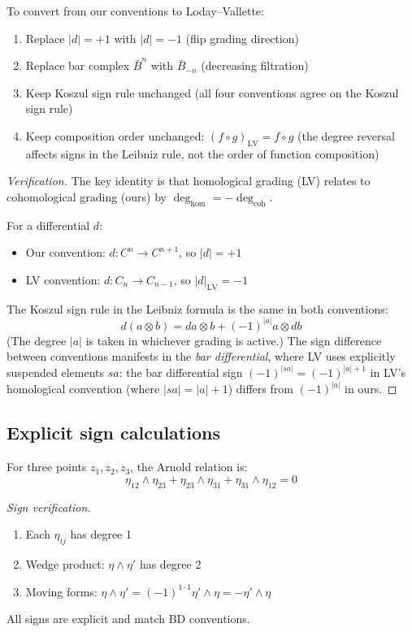 \begin{proposition}\label{prop:LV-conversion-complete}
To convert from our conventions to Loday--Vallette:
\begin{enumerate}
\item Replace $|d| = +1$ with $|d| = -1$ (flip grading direction)
\item Replace bar complex $\bar{B}^n$ with $\bar{B}_{-n}$ (decreasing filtration)
\item Keep Koszul sign rule unchanged (all four conventions agree on the Koszul sign rule)
\item Keep composition order unchanged: $(f \circ g)_{\text{LV}} = f \circ g$ (the degree reversal affects signs in the Leibniz rule, not the order of function composition)
\end{enumerate}
\end{proposition}

\begin{proof}[Verification]
The key identity is that homological grading (LV) relates to cohomological grading 
(ours) by $\deg_{\text{hom}} = -\deg_{\text{coh}}$.

For a differential $d$:
\begin{itemize}
\item Our convention: $d: C^n \to C^{n+1}$, so $|d| = +1$
\item LV convention: $d: C_n \to C_{n-1}$, so $|d|_{\text{LV}} = -1$
\end{itemize}

The Koszul sign rule in the Leibniz formula is the same in both conventions:
\[d(a \otimes b) = da \otimes b + (-1)^{|a|} a \otimes db\]
(The degree $|a|$ is taken in whichever grading is active.)  The sign difference between conventions manifests in the \emph{bar differential}, where LV uses explicitly suspended elements $sa$: the bar differential sign $(-1)^{|sa|} = (-1)^{|a|+1}$ in LV's homological convention (where $|sa| = |a|+1$) differs from $(-1)^{|a|}$ in ours.
\end{proof}

\subsection{Explicit sign calculations}

\begin{example}\label{ex:arnold-sign-explicit-dict}
For three points $z_1, z_2, z_3$, the Arnold relation is:
\[\eta_{12} \wedge \eta_{23} + \eta_{23} \wedge \eta_{31} + \eta_{31} \wedge \eta_{12} = 0\]

\emph{Sign verification.}
\begin{enumerate}
\item Each $\eta_{ij}$ has degree 1
\item Wedge product: $\eta \wedge \eta'$ has degree 2
\item Moving forms: $\eta \wedge \eta' = (-1)^{1 \cdot 1} \eta' \wedge \eta = -\eta' \wedge \eta$
\end{enumerate}

All signs are explicit and match BD conventions.
\end{example}

